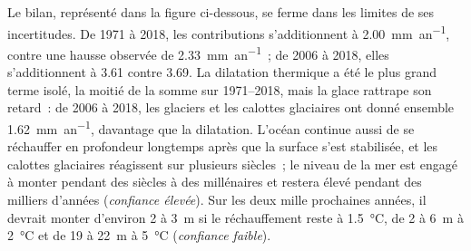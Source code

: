 Le bilan, représenté dans la figure ci-dessous, se ferme dans les limites de ses incertitudes. De 1971 à 2018, les
contributions s'additionnent à \qty{2.00}{mm.an^{-1}}, contre une hausse observée de \qty{2.33}{mm.an^{-1}}~; de 2006 à 2018,
elles s'additionnent à 3.61 contre 3.69. La dilatation thermique a été le plus grand terme isolé, la moitié de la somme sur
1971--2018, mais la glace rattrape son retard~: de 2006 à 2018, les glaciers et les calottes glaciaires ont donné ensemble
\qty{1.62}{mm.an^{-1}}, davantage que la dilatation. L'océan continue aussi de se réchauffer en profondeur longtemps après
que la surface s'est stabilisée, et les calottes glaciaires réagissent sur plusieurs siècles~; le niveau de la mer est engagé
à monter pendant des siècles à des millénaires et restera élevé pendant des milliers d'années (\emph{confiance élevée}). Sur
les deux mille prochaines années, il devrait monter d'environ 2 à \qty{3}{m} si le réchauffement reste à \qty{1.5}{\celsius},
de 2 à \qty{6}{m} à \qty{2}{\celsius} et de 19 à \qty{22}{m} à \qty{5}{\celsius} (\emph{confiance faible}).

